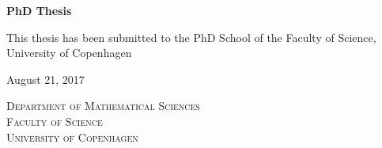 \maketitle
\thispagestyle{empty}
\begin{center}
\LARGE
\Huge\textbf{PhD Thesis}

\vspace{7em}
\LARGE
This thesis has been submitted to the PhD School of the Faculty of Science, University of Copenhagen

\vspace{2em}

August 21, 2017

\vspace{2em}

\textsc{Department of Mathematical Sciences \\ Faculty of Science \\ University of Copenhagen}
\end{center}
